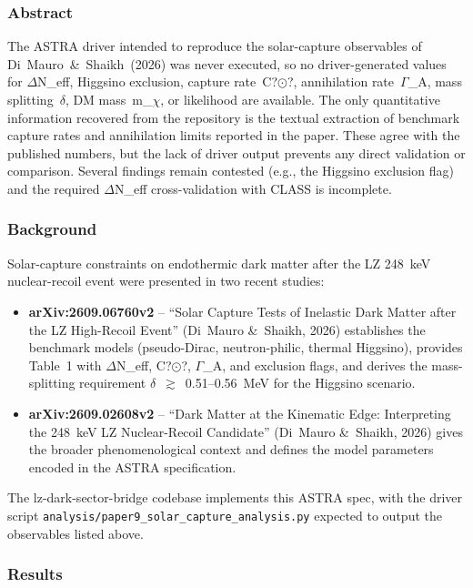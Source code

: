 \documentclass[11pt,a4paper]{article}
\begin{document}
\subsubsection*{Abstract}
The ASTRA driver intended to reproduce the solar-capture observables of Di~Mauro~\&~Shaikh~(2026) was never executed, so no driver-generated values for $\Delta$N\_eff, Higgsino exclusion, capture rate~C?$\odot$?, annihilation rate~$\Gamma$\_A, mass splitting~$\delta$, DM mass~m\_$\chi$, or likelihood are available. The only quantitative information recovered from the repository is the textual extraction of benchmark capture rates and annihilation limits reported in the paper. These agree with the published numbers, but the lack of driver output prevents any direct validation or comparison. Several findings remain contested (e.g., the Higgsino exclusion flag) and the required $\Delta$N\_eff cross-validation with CLASS is incomplete.

\subsubsection*{Background}
Solar-capture constraints on endothermic dark matter after the LZ 248~keV nuclear-recoil event were presented in two recent studies:

\begin{itemize}
  \item \textbf{arXiv:2609.06760v2} -- ``Solar Capture Tests of Inelastic Dark Matter after the LZ High-Recoil Event'' (Di~Mauro \&~Shaikh, 2026) establishes the benchmark models (pseudo-Dirac, neutron-philic, thermal Higgsino), provides Table~1 with $\Delta$N\_eff, C?$\odot$?, $\Gamma$\_A, and exclusion flags, and derives the mass-splitting requirement $\delta$~$\gtrsim$~0.51--0.56~MeV for the Higgsino scenario.
  \item \textbf{arXiv:2609.02608v2} -- ``Dark Matter at the Kinematic Edge: Interpreting the 248~keV LZ Nuclear-Recoil Candidate'' (Di~Mauro \&~Shaikh, 2026) gives the broader phenomenological context and defines the model parameters encoded in the ASTRA specification.
\end{itemize}
The lz-dark-sector-bridge codebase implements this ASTRA spec, with the driver script \texttt{analysis/\allowbreak{}paper9\_\allowbreak{}solar\_\allowbreak{}capture\_\allowbreak{}analysis.py} expected to output the observables listed above.

\subsubsection*{Results}
\end{document}
